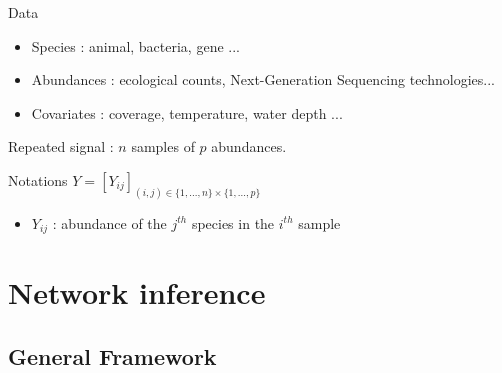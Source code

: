 \documentclass{beamer}
\newcommand{\emphase}[1]{\textcolor{Complement}{#1}}
\begin{document}

\begin{frame}{Data}
	\begin{itemize}
	\item \emphase{Species} : animal, bacteria, gene ...
	\item \emphase{Abundances} : ecological counts, Next-Generation Sequencing technologies...
	\item \emphase{Covariates} : coverage, temperature, water depth ... 
\end{itemize}
	Repeated signal : $n$ samples of $p$ abundances.
\begin{block}{Notations}
	$Y = [Y_{ij}]_{(i,j) \in \{1,...,n\} \times \{1,..., p\}} $
	\begin{itemize}
	\item $Y_{ij}$ : abundance of the $j^{th}$ species in the $i^{th}$ sample
\end{itemize}
\end{block}
\begin{center}
	\color{Nicered}{Infer the species interaction network from $Y$}
\end{center}
\end{frame}

\section{Network inference}
\subsection{General Framework}
\end{document}
